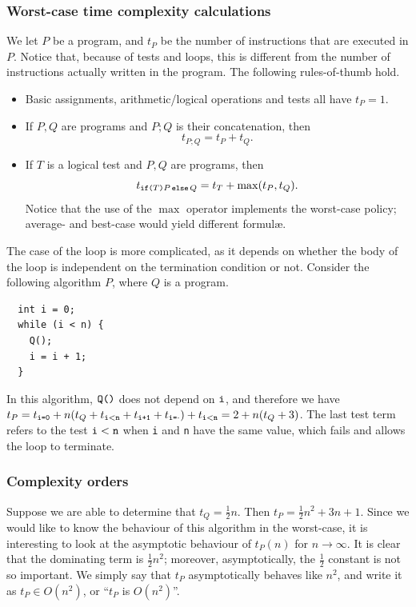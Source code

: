 \documentclass[a4paper]{book}
\theoremstyle{changebreak}                %
\begin{document}
\subsubsection{Worst-case time complexity calculations}
\label{s:computation:timeworstcase}
We let $P$ be a program, and $t_P$ be the number of instructions that
are executed in $P$. Notice that, because of tests and loops, this is
different from the number of instructions actually written in the
program. The following rules-of-thumb hold.
\begin{itemize}
\item Basic assignments, arithmetic/logical
  operations and tests all have $t_P=1$.
\item If $P,Q$ are programs and $P;Q$ is their
  concatenation, then
\begin{equation}
  t_{P;Q} = t_P+t_Q. \label{eq:concatenation}
\end{equation}
\item If $T$ is a logical test and $P,Q$ are programs, then
\begin{equation}
  t_{\mbox{\scriptsize\tt if($T$)$P$\,else\,$Q$}} = t_T +
  \max(t_P,t_Q).\label{eq:test}
\end{equation}
Notice that the use of the $\max$ operator implements the
worst-case policy; average- and best-case
would yield different formul{\ae}.
\end{itemize}
The case of the loop is more complicated, as it depends on
whether the body of the loop is independent on the
termination condition or not. Consider the
following algorithm $P$, where $Q$ is a program.
\begin{verbatim}
  int i = 0;
  while (i < n) {
    Q();
    i = i + 1;
  }
\end{verbatim}
In this algorithm, $\mbox{\tt Q()}$ does not depend on $\mbox{\tt i}$,
and therefore we have $t_P = t_{\mbox{\scriptsize\tt i=0}} +
n(t_Q+t_{\mbox{\scriptsize\tt i$<$n}}+t_{\mbox{\scriptsize\tt i+1}}+
t_{\mbox{\scriptsize\tt i=$\cdot$}})+t_{\mbox{\scriptsize\tt
    i$<$n}}=2+n(t_Q+3)$. The last test term refers to the test
$\mbox{\tt i}<\mbox{\tt n}$ when {\tt i} and {\tt n} have the same
value, which fails and allows the loop to terminate.

\subsubsection{Complexity orders}
\label{s:computation:complexityorder}
Suppose we are able to determine that $t_Q=\frac{1}{2}n$. Then
$t_P=\frac{1}{2}n^2+3n+1$. Since we would like to know the behaviour
of this algorithm in the worst-case, it
is interesting to look at the asymptotic behaviour of $t_P(n)$ for
$n\to\infty$. It is clear that the dominating term is
$\frac{1}{2}n^2$; moreover, asymptotically, the $\frac{1}{2}$
constant is not so important. We simply say that $t_P$
asymptotically behaves like $n^2$, and write it as $t_P\in O(n^2)$, or
``$t_P$ is $O(n^2)$''.
\end{document}
